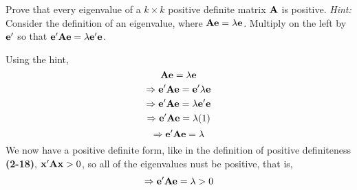         Prove that every eigenvalue of a $k \times k$ positive definite matrix $\bold{A}$ is positive.
        \newline
        \textit{Hint:} Consider the definition of an eigenvalue, where $\bold{A}\bold{e} = \lambda\bold{e}$. Multiply on the left by
        $\bold{e}^\prime$ so that $\bold{e}^\prime\bold{A}\bold{e} = \lambda\bold{e}^\prime\bold{e}$.
        \newline
        \par
        Using the hint,
        \[
            \bold{A}\bold{e} = \lambda\bold{e}
        \]
        \[
            \Rightarrow \bold{e}^\prime\bold{A}\bold{e} = \bold{e}^\prime\lambda\bold{e}
        \]
        \[
            \Rightarrow \bold{e}^\prime\bold{A}\bold{e} = \lambda\bold{e}^\prime\bold{e}
        \]
        \[
            \Rightarrow \bold{e}^\prime\bold{A}\bold{e} = \lambda(1)
        \]
        \[
            \Rightarrow \bold{e}^\prime\bold{A}\bold{e} = \lambda
        \]
        We now have a positive definite form, like in the definition of positive definiteness \textbf{(2-18)}, $\bold{x}^\prime\bold{A}\bold{x} > 0$, so all of the eigenvalues nust be positive, that is,
        \[
            \Rightarrow \bold{e}^\prime\bold{A}\bold{e} = \lambda > 0
        \]